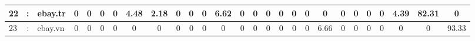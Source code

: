 \documentclass[crop]{standalone}
\begin{document}
\begin{tabular}{|lcl|c|c|c|c|c|c|c|c|c|c|c|c|c|c|c|c|c|c|c|c|c|c|c|c|}
22 & : & ebay.tr & 0 & 0 & 0 & 0 & \cellcolor{red!4.48}4.48 & \cellcolor{red!2.18}2.18 & 0 & 0 & 0 & \cellcolor{red!6.619999999999999}6.62 & 0 & 0 & 0 & 0 & 0 & 0 & 0 & 0 & 0 & 0 & 0 & \cellcolor{red!4.39}4.39 & \cellcolor{green!82.31}82.31 & 0 \\ \hline
23 & : & ebay.vn & 0 & 0 & 0 & 0 & 0 & 0 & 0 & 0 & 0 & 0 & 0 & 0 & 0 & 0 & 0 & 0 & \cellcolor{red!6.660000000000001}6.66 & 0 & 0 & 0 & 0 & 0 & 0 & \cellcolor{green!93.33}93.33 \\ \hline
\end{tabular}
\end{document}
